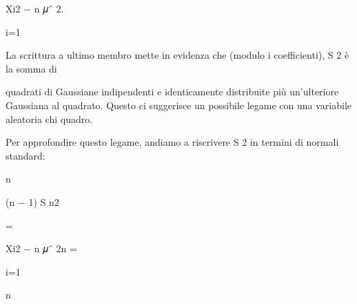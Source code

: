 \documentclass[a4paper,portrait,12pt]{article}
\begin{document}
\begin{flushleft}
Xi2 $-$ n 𝜇ˆ 2.
\end{flushleft}





\begin{flushleft}
i=1
\end{flushleft}





\begin{flushleft}
La scrittura a ultimo membro mette in evidenza che (modulo i coefficienti), S 2 \`{e} la somma di
\end{flushleft}


\begin{flushleft}
quadrati di Gaussiane indipendenti e identicamente distribuite più un'ulteriore Gaussiana al quadrato. Questo ci suggerisce un possibile legame con una variabile aleatoria chi quadro.
\end{flushleft}


\begin{flushleft}
Per approfondire questo legame, andiamo a riscrivere S 2 in termini di normali standard:
\end{flushleft}


\begin{flushleft}
n
\end{flushleft}





\begin{flushleft}
(n $-$ 1) S n2
\end{flushleft}





=





\begin{flushleft}
Xi2 $-$ n 𝜇ˆ 2n =
\end{flushleft}





\begin{flushleft}
i=1
\end{flushleft}


\begin{flushleft}
n
\end{flushleft}
\end{document}

